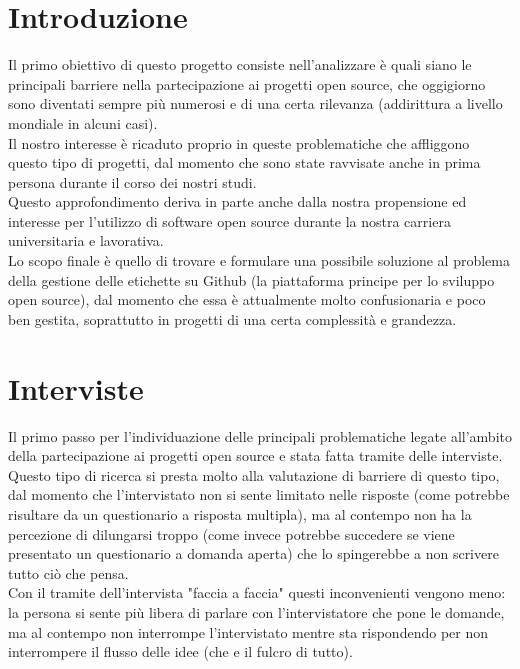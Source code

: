 \documentclass[12pt]{article} %
\begin{document}
\section{Introduzione}
Il primo obiettivo di questo progetto consiste nell'analizzare è quali siano le principali barriere nella partecipazione ai progetti open source, che oggigiorno sono diventati sempre più numerosi e di una certa rilevanza (addirittura a livello mondiale in alcuni casi).\\
Il nostro interesse è ricaduto proprio in queste problematiche che affliggono questo tipo di progetti, dal momento che sono state ravvisate anche in prima persona durante il corso dei nostri studi. \\
Questo approfondimento deriva in parte anche dalla nostra propensione ed interesse per l'utilizzo di software open source durante la nostra carriera universitaria e lavorativa.\\
Lo scopo finale è quello di trovare e formulare una possibile soluzione al problema della gestione delle etichette su Github (la piattaforma principe per lo sviluppo open source), dal momento che essa è attualmente molto confusionaria e poco ben gestita, soprattutto in progetti di una certa complessità e grandezza.

\section{Interviste}
Il primo passo per l'individuazione delle principali problematiche legate all'ambito della partecipazione ai progetti open source e stata fatta tramite delle interviste. Questo tipo di ricerca si presta molto alla valutazione di barriere di questo tipo, dal momento che l'intervistato non si sente limitato nelle risposte (come potrebbe risultare da un questionario a risposta multipla), ma al contempo non ha la percezione di dilungarsi troppo (come invece potrebbe succedere se viene presentato un questionario a domanda aperta) che lo spingerebbe a non scrivere tutto ciò che pensa. \\
Con il tramite dell'intervista "faccia a faccia" questi inconvenienti vengono meno: la persona si sente più libera di parlare con l'intervistatore che pone le domande, ma al contempo non interrompe l'intervistato mentre sta rispondendo per non interrompere il flusso delle idee (che e il fulcro di tutto).\\
\end{document}
